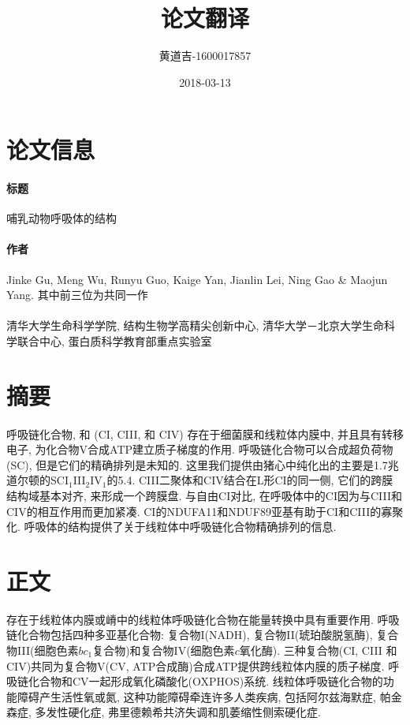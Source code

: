 \documentclass{article}
\title{论文翻译}
\date{2018-03-13}
\author{
  黄道吉-1600017857
}
\begin{document}
\maketitle

\section{论文信息}
  \paragraph{标题} 哺乳动物呼吸体的结构
  \paragraph{作者} Jinke Gu, Meng Wu, Runyu Guo, Kaige Yan, Jianlin Lei, Ning Gao \& Maojun Yang. 其中前三位为共同一作
  \paragraph{} 清华大学生命科学学院, 结构生物学高精尖创新中心, 清华大学－北京大学生命科学联合中心, 蛋白质科学教育部重点实验室
\section{摘要}
  \paragraph{}
    呼吸链化合物\uppercase\expandafter{}, \uppercase\expandafter{} 和 \uppercase\expandafter{}(CI, CIII, 和 CIV) 存在于细菌膜和线粒体内膜中, 并且具有转移电子, 为化合物V合成ATP建立质子梯度的作用. 呼吸链化合物可以合成超负荷物(SC), 但是它们的精确排列是未知的. 这里我们提供由猪心中纯化出的主要是1.7兆道尔顿的SCI$_1$III$_2$IV$_1$的5.4. CIII二聚体和CIV结合在L形CI的同一侧, 它们的跨膜结构域基本对齐, 来形成一个跨膜盘. 与自由CI对比, 在呼吸体中的CI因为与CIII和CIV的相互作用而更加紧凑. CI的NDUFA11和NDUF89亚基有助于CI和CIII的寡聚化. 呼吸体的结构提供了关于线粒体中呼吸链化合物精确排列的信息.

\section{正文}
  \paragraph{}
    存在于线粒体内膜或嵴中的线粒体呼吸链化合物在能量转换中具有重要作用. 呼吸链化合物包括四种多亚基化合物: 复合物I(NADH), 复合物II(琥珀酸脱氢酶), 复合物III(细胞色素$bc_1$复合物)和复合物IV(细胞色素$c$氧化酶). 三种复合物(CI, CIII 和 CIV)共同为复合物V(CV, ATP合成酶)合成ATP提供跨线粒体内膜的质子梯度. 呼吸链化合物和CV一起形成氧化磷酸化(OXPHOS)系统. 线粒体呼吸链化合物的功能障碍产生活性氧或氮, 这种功能障碍牵连许多人类疾病, 包括阿尔兹海默症, 帕金森症, 多发性硬化症, 弗里德赖希共济失调和肌萎缩性侧索硬化症.
\end{document}
